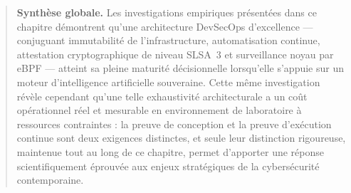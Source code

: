 \begin{quote}
\textbf{Synthèse globale.} Les investigations empiriques présentées dans ce chapitre démontrent qu'une architecture DevSecOps d'excellence — conjuguant immutabilité de l'infrastructure, automatisation continue, attestation cryptographique de niveau SLSA~3 et surveillance noyau par eBPF — atteint sa pleine maturité décisionnelle lorsqu'elle s'appuie sur un moteur d'intelligence artificielle souveraine. Cette même investigation révèle cependant qu'une telle exhaustivité architecturale a un coût opérationnel réel et mesurable en environnement de laboratoire à ressources contraintes : la preuve de conception et la preuve d'exécution continue sont deux exigences distinctes, et seule leur distinction rigoureuse, maintenue tout au long de ce chapitre, permet d'apporter une réponse scientifiquement éprouvée aux enjeux stratégiques de la cybersécurité contemporaine.
\end{quote}